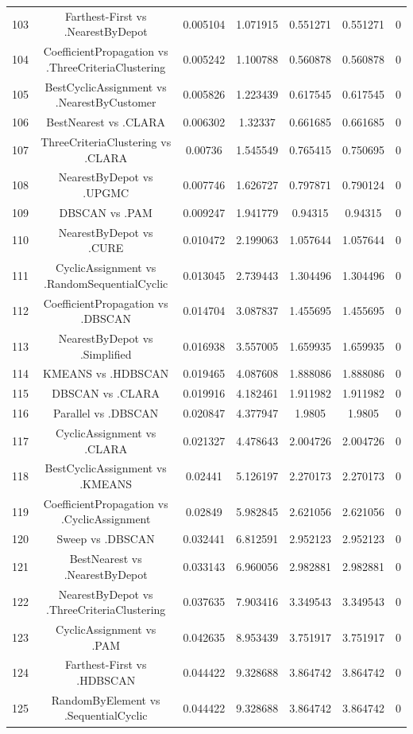 \documentclass[a4paper,10pt]{article}
\begin{document}
\begin{landscape}
\begin{table}[!htp]
\begin{tabular}{ccccccc}
103&Farthest-First vs .NearestByDepot&0.005104&1.071915&0.551271&0.551271&0\\
104&CoefficientPropagation vs .ThreeCriteriaClustering&0.005242&1.100788&0.560878&0.560878&0\\
105&BestCyclicAssignment vs .NearestByCustomer&0.005826&1.223439&0.617545&0.617545&0\\
106&BestNearest vs .CLARA&0.006302&1.32337&0.661685&0.661685&0\\
107&ThreeCriteriaClustering vs .CLARA&0.00736&1.545549&0.765415&0.750695&0\\
108&NearestByDepot vs .UPGMC&0.007746&1.626727&0.797871&0.790124&0\\
109&DBSCAN vs .PAM&0.009247&1.941779&0.94315&0.94315&0\\
110&NearestByDepot vs .CURE&0.010472&2.199063&1.057644&1.057644&0\\
111&CyclicAssignment vs .RandomSequentialCyclic&0.013045&2.739443&1.304496&1.304496&0\\
112&CoefficientPropagation vs .DBSCAN&0.014704&3.087837&1.455695&1.455695&0\\
113&NearestByDepot vs .Simplified&0.016938&3.557005&1.659935&1.659935&0\\
114&KMEANS vs .HDBSCAN&0.019465&4.087608&1.888086&1.888086&0\\
115&DBSCAN vs .CLARA&0.019916&4.182461&1.911982&1.911982&0\\
116&Parallel vs .DBSCAN&0.020847&4.377947&1.9805&1.9805&0\\
117&CyclicAssignment vs .CLARA&0.021327&4.478643&2.004726&2.004726&0\\
118&BestCyclicAssignment vs .KMEANS&0.02441&5.126197&2.270173&2.270173&0\\
119&CoefficientPropagation vs .CyclicAssignment&0.02849&5.982845&2.621056&2.621056&0\\
120&Sweep vs .DBSCAN&0.032441&6.812591&2.952123&2.952123&0\\
121&BestNearest vs .NearestByDepot&0.033143&6.960056&2.982881&2.982881&0\\
122&NearestByDepot vs .ThreeCriteriaClustering&0.037635&7.903416&3.349543&3.349543&0\\
123&CyclicAssignment vs .PAM&0.042635&8.953439&3.751917&3.751917&0\\
124&Farthest-First vs .HDBSCAN&0.044422&9.328688&3.864742&3.864742&0\\
125&RandomByElement vs .SequentialCyclic&0.044422&9.328688&3.864742&3.864742&0\\

\end{tabular}
\end{table}
\end{landscape}
\end{document}
